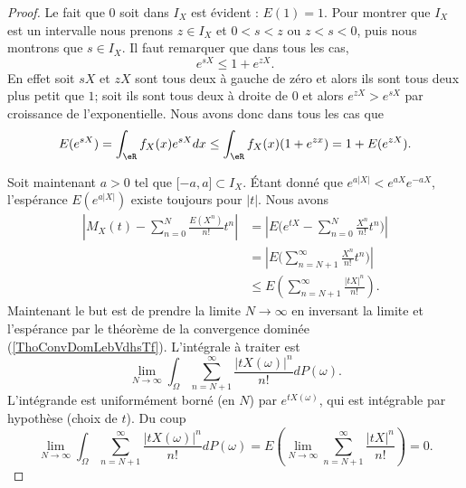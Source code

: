 \begin{proof}
	Le fait que \( 0\) soit dans \( I_X\) est évident : \( E(1)=1\). Pour montrer que \( I_X\) est un intervalle nous prenons \( z\in I_X\) et \( 0<s<z\) ou \( z<s<0\), puis nous montrons que \( s\in I_X\). Il faut remarquer que dans tous les cas,
	\begin{equation}
		e^{sX}\leq 1+ e^{zX}.
	\end{equation}
	En effet soit \( sX\) et \( zX\) sont tous deux à gauche de zéro et alors ils sont tous deux plus petit que \( 1\); soit ils sont tous deux à droite de \( 0\) et alors \( e^{zX}> e^{sX}\) par croissance de l'exponentielle. Nous avons donc dans tous les cas que
	\begin{equation}
		E( e^{sX})=\int_{\eR}f_X(x) e^{sX}dx\leq \int_{\eR}f_X(x)(1+ e^{zx})=1+E( e^{zX}).
	\end{equation}

	Soit maintenant \( a>0\) tel que \( \mathopen[ -a , a \mathclose]\subset I_X\). Étant donné que \(  e^{a| X |}< e^{aX} e^{-aX}\), l'espérance \( E( e^{a| X |})\) existe toujours pour \( | t |\). Nous avons
	\begin{subequations}
		\begin{align}
			\left| M_X(t)-\sum_{n=0}^N\frac{ E(X^n) }{ n! }t^n \right| & =\left| E\Big(  e^{tX}-\sum_{n=0}^N\frac{ X^n }{ n! }t^n \Big) \right|  \\
			                                                           & =\left| E\Big( \sum_{n=N+1}^{\infty}\frac{ X^n }{ n! }t^n \Big) \right| \\
			                                                           & \leq E\left( \sum_{n=N+1}^{\infty}\frac{ | tX |^n }{ n! } \right).
		\end{align}
	\end{subequations}
	Maintenant le but est de prendre la limite \( N\to\infty\) en inversant la limite et l'espérance par le théorème de la convergence dominée (\ref{ThoConvDomLebVdhsTf}). L'intégrale à traiter est
	\begin{equation}
		\lim_{N\to \infty} \int_{\Omega}\sum_{n=N+1}^{\infty}\frac{ | tX(\omega) |^n }{ n! }dP(\omega).
	\end{equation}
	L'intégrande est uniformément borné (en \( N\)) par \(  e^{tX(\omega)}\), qui est intégrable par hypothèse (choix de \( t\)). Du coup
	\begin{equation}
		\lim_{N\to \infty} \int_{\Omega}\sum_{n=N+1}^{\infty}\frac{ | tX(\omega) |^n }{ n! }dP(\omega)=E\left( \lim_{N\to \infty} \sum_{n=N+1}^{\infty}\frac{ | tX |^n }{ n! } \right)=0.
	\end{equation}
\end{proof}

